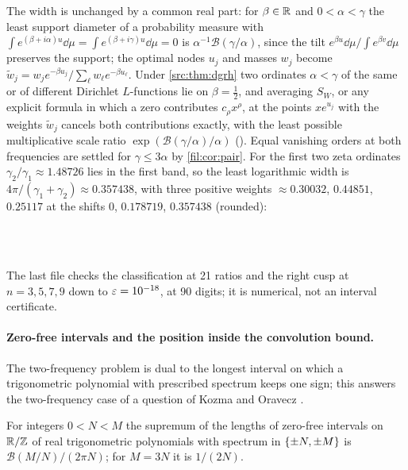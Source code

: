 The width is unchanged by a common real part: for $\beta\in\mathbb{R}$ and $0<\alpha<\gamma$ the least support diameter
of a probability measure with $\int e^{(\beta+i\alpha)u}\dd\mu=\int e^{(\beta+i\gamma)u}\dd\mu=0$ is $\alpha^{-1}\mathcal B(\gamma/\alpha)$, since the
tilt $e^{\beta u}\dd\mu/\int e^{\beta v}\dd\mu$ preserves the support; the optimal nodes $u_j$ and masses $w_j$ become
$\widetilde w_j=w_je^{-\beta u_j}/\sum_\ell w_\ell e^{-\beta u_\ell}$. Under \cref{src:thm:dgrh} two ordinates $\alpha<\gamma$ of the same or
of different Dirichlet $L$-functions lie on $\beta=\tfrac12$, and averaging $S_W$, or any explicit formula in which a
zero contributes $c_\rho x^\rho$, at the points $xe^{u_j}$ with the weights $\widetilde w_j$ cancels both contributions
exactly, with the least possible multiplicative scale ratio $\exp(\mathcal B(\gamma/\alpha)/\alpha)$ (\stG). Equal
vanishing orders at both frequencies are settled for $\gamma\le3\alpha$ by \cref{fil:cor:pair}. For the first two zeta ordinates
$\gamma_2/\gamma_1\approx1.48726$ lies in the first band, so the least logarithmic width is
$4\pi/(\gamma_1+\gamma_2)\approx0.357438$, with three positive weights $\approx0.30032$, $0.44851$, $0.25117$ at the
shifts $0$, $0.178719$, $0.357438$ (rounded):
\begin{center}
\\
\\
\end{center}
The last file checks the classification at 21 ratios and the right cusp at $n=3,5,7,9$ down to
$\varepsilon=10^{-18}$, at 90 digits; it is numerical, not an interval certificate.

\paragraph{Zero-free intervals and the position inside the convolution bound.}
The two-frequency problem is dual to the longest interval on which a trigonometric polynomial with
prescribed spectrum keeps one sign; this answers the two-frequency case of a question of Kozma and Oravecz
\cite{KozmaOravecz2003Gaps}.

\begin{corollary}\label{rec:cor:kozma}
For integers $0<N<M$ the supremum of the lengths of zero-free intervals on $\mathbb{R}/\mathbb{Z}$ of real trigonometric
polynomials with spectrum in $\{\pm N,\pm M\}$ is $\mathcal B(M/N)/(2\pi N)$; for $M=3N$ it is $1/(2N)$.
\end{corollary}

